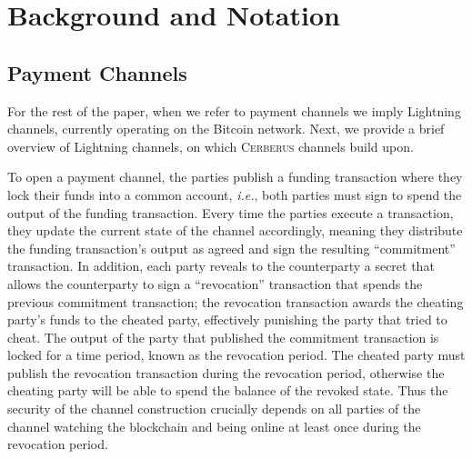 \documentclass[runningheads]{llncs}
\newcommand{\authnote}[3]{{ \footnotesize \bf{#1[#2: #3]~}}} %
\newcommand{\edit}[1]{\authnote{\color{blue}}{edit}{#1}}
\newcommand{\ie}{{\em i.e.}}
\newcommand{\sys}{\textsc{Cerberus}\xspace}
\begin{document}
\section{Background and Notation}
\label{sec:back}
\subsection{Payment Channels}
For the rest of the paper, when we refer to payment channels we imply Lightning channels, currently operating on the Bitcoin network. 
Next, we provide a brief overview of Lightning channels, on which \sys channels build upon.

To open a payment channel, the parties publish a funding transaction where they lock their funds into a common account, \ie, both parties must sign to spend the output of the funding transaction. Every time the parties execute a transaction, they update the current state of the channel accordingly, meaning they distribute the funding transaction's output as agreed and sign  the resulting ``commitment'' transaction. In addition, each party reveals to the counterparty a secret that allows the counterparty to  sign a ``revocation'' transaction that spends the previous commitment transaction; the revocation transaction awards  the cheating party's funds to the cheated party, effectively punishing the party that tried to cheat.
The output of the party that published the commitment transaction is locked for a time period, known as the revocation period. The cheated party must publish the revocation transaction during the revocation period, otherwise the  cheating party will be able to spend the balance of the revoked state. Thus the security of the channel construction  crucially depends on all parties of the channel watching the blockchain and being online at least once during the revocation period.

\end{document}
